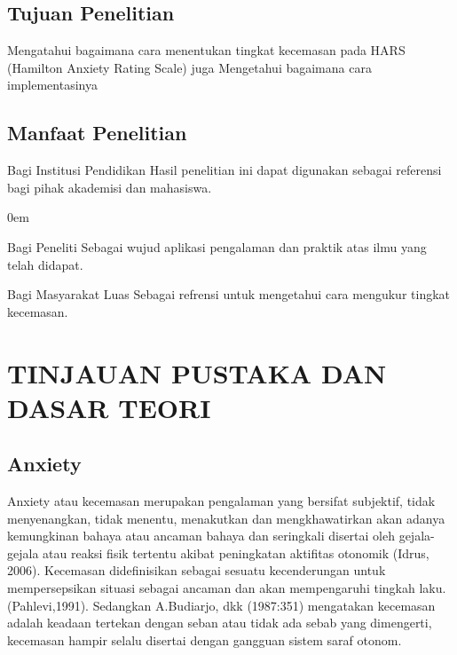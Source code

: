 \documentclass{jtetiproposalskripsi}
\begin{document}
\section{Tujuan Penelitian}
Mengatahui bagaimana cara menentukan tingkat kecemasan pada  HARS (Hamilton Anxiety Rating Scale) juga Mengetahui bagaimana cara implementasinya

\section{Manfaat Penelitian}
Bagi Institusi Pendidikan
	Hasil penelitian ini dapat digunakan sebagai referensi bagi pihak akademisi dan mahasiswa.
	\begin{enumerate}[a.]
\begin{singlespace}
\itemsep0em
\item Bagi Peneliti
	Sebagai wujud aplikasi pengalaman dan praktik atas ilmu yang telah didapat.
\item Bagi Masyarakat Luas
	Sebagai refrensi untuk mengetahui cara mengukur tingkat kecemasan.
\end{singlespace}
\end{enumerate}


\chapter{TINJAUAN PUSTAKA DAN DASAR TEORI}                

\section{Anxiety}
Anxiety atau kecemasan merupakan pengalaman yang bersifat subjektif, tidak menyenangkan, tidak menentu, menakutkan dan mengkhawatirkan akan adanya kemungkinan bahaya atau ancaman bahaya dan seringkali disertai oleh gejala-gejala atau reaksi fisik tertentu akibat peningkatan aktifitas otonomik (Idrus, 2006).
Kecemasan didefinisikan sebagai sesuatu kecenderungan untuk mempersepsikan situasi sebagai ancaman dan akan mempengaruhi tingkah laku. (Pahlevi,1991). Sedangkan A.Budiarjo, dkk (1987:351) mengatakan kecemasan adalah keadaan tertekan dengan seban atau tidak ada sebab yang dimengerti, kecemasan hampir selalu disertai dengan gangguan sistem saraf otonom.
\end{document}
